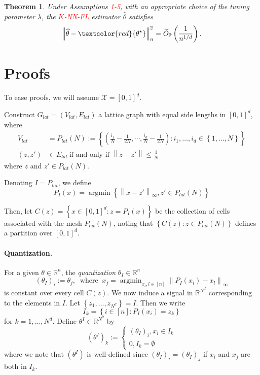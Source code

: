 \documentclass{article}
\newcommand{\Reals}{\mathbb{R}}
\newcommand{\norm}[1]{\left\lVert#1\right\rVert}
\newcommand{\set}[1]{\left\{#1\right\}}
\newcommand{\1}{\mathbb{I}}
\DeclareMathOperator*{\argmin}{argmin}
\newcommand{\Xset}{\mathcal{X}}
\newcommand{\Pbb}{\mathbb{P}}
\theoremstyle{alden}
\theoremstyle{aldenthm}
\newtheorem{theorem}{Theorem}
\theoremstyle{definition}
\theoremstyle{remark}
\begin{document}
\begin{theorem}
	\label{thm: padilla18_theorem_2}
	Under Assumptions \textcolor{red}{1-5}, with an appropriate choice of the tuning parameter $\lambda$, the \textcolor{red}{$K$-NN-FL} estimator $\widehat{\theta}$ satisfies
	\begin{equation*}
	\norm{\widehat{\theta} - \textcolor{red}{\theta^{\star}}}_n^2 = \widetilde{O}_{\Pbb}\left( \frac{1}{n^{1/d}} \right).
	\end{equation*}
\end{theorem}

\section{Proofs}

To ease proofs, we will assume $\Xset = [0,1]^d$. 

Construct $G_{lat} = (V_{lat}, E_{lat})$ a lattice graph with equal side lengths in $[0,1]^d$, where
\begin{align*}
V_{lat} & = P_{lat}(N) := \set{\left(\frac{i_1}{N} - \frac{1}{2N}, \cdots, \frac{i_d}{N} - \frac{1}{2N}\right): i_1, \ldots, i_d \in \set{1, \ldots, N}} \\
(z,z') & \in E_{lat}~ \text{if and only if $\norm{z - z'} \leq \frac{1}{N}$}
\end{align*}
where $z$ and $z' \in P_{lat}(N)$.

Denoting $I = P_{lat}$, we define
\begin{equation*}
P_I(x) = \argmin \set{\norm{x - z'}_{\infty}, z' \in P_{lat}(N)}
\end{equation*}

Then, let $C(z) = \set{x \in [0,1]^d: z =  P_I(x)}$ be the collection of cells associated with the mesh $P_{lat}(N)$, noting that $\set{C(z): z \in P_{lat}(N)}$ defines a partition over $[0,1]^d$.

\paragraph{Quantization.}

For a given $\theta \in \Reals^n$, the \emph{quantization} $\theta_I \in \Reals^n$
\begin{equation*}
(\theta_{I})_i := \theta_j,~ \text{ where }~ x_j = \argmin_{x_l, l \in [n]} \norm{P_I(x_i) - x_l}_{\infty}
\end{equation*}
is constant over every cell $C(z)$. We now induce a signal in $\Reals^{N^d}$ corresponding to the elements in $I$. Let $\set{z_1, \ldots, z_{N^d}} = I$. Then
we write
\begin{equation*}
I_k = \set{i \in [n]: P_I(x_i) = z_k} 
\end{equation*}
for $k = 1,\ldots, N^d$. Define $\theta^{I} \in \Reals^{N^d}$ by
\begin{equation*}
(\theta^{I})_k := 
\begin{cases}
(\theta_I)_i, x_i \in I_k \\
0, I_k = \emptyset
\end{cases}
\end{equation*}
where we note that $(\theta^{I})$ is well-defined since $(\theta_I)_i = (\theta_I)_j$ if $x_i$ and $x_j$ are both in $I_k$.
\end{document}
